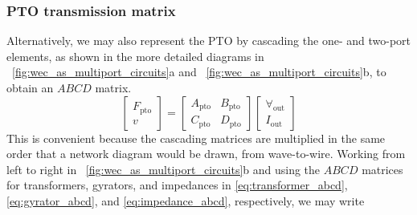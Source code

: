 \documentclass[5p,times]{elsarticle}
\begin{document}
\subsubsection{PTO transmission matrix}\label{sec:pto_transmission_matrix}
Alternatively, we may also represent the PTO by cascading the one- and two-port elements, as shown in the more detailed diagrams in \figurename~\ref{fig:wec_as_multiport_circuits}a and \figurename~\ref{fig:wec_as_multiport_circuits}b, to obtain an $ABCD$ matrix.
%
\begin{equation}
	\label{eq:pto_ABCD_mat_def}
	\begin{bmatrix} 
		F_{\textrm{pto}} \\
		v 
	\end{bmatrix} 
	= 
        \begin{bmatrix} 
	A_{\textrm{pto}} & B_{\textrm{pto}} \\ 
	C_{\textrm{pto}} & D_{\textrm{pto}} 
        \end{bmatrix}
	\begin{bmatrix} 
		\forall_{\textrm{out}} \\
		I_{\textrm{out}} 
	\end{bmatrix}
\end{equation}
%
This is convenient because the cascading matrices are multiplied in the same order that a network diagram would be drawn, from wave-to-wire.
Working from left to right in \figurename~\ref{fig:wec_as_multiport_circuits}b and using the $ABCD$ matrices for transformers, gyrators, and impedances in \eqref{eq:transformer_abcd}, \eqref{eq:gyrator_abcd}, and \eqref{eq:impedance_abcd}, respectively, we may write 
%
\end{document}

